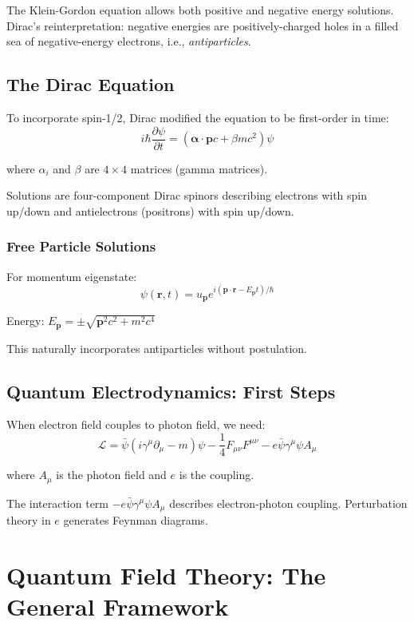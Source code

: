 \documentclass[12pt,openany,oneside]{book}
\begin{document}
{{{The Klein-Gordon equation allows both positive and negative energy solutions. Dirac's reinterpretation: negative energies are positively-charged holes in a filled sea of negative-energy electrons, i.e., \textit{antiparticles}.

\section{The Dirac Equation}

To incorporate spin-1/2, Dirac modified the equation to be first-order in time:
\[
i\hbar\frac{\partial\psi}{\partial t} = (\boldsymbol{\alpha} \cdot \mathbf{p}c + \beta mc^2)\psi
\]

where $\alpha_i$ and $\beta$ are $4 \times 4$ matrices (gamma matrices).

Solutions are four-component Dirac spinors describing electrons with spin up/down and antielectrons (positrons) with spin up/down.

\subsection{Free Particle Solutions}

For momentum eigenstate:
\[
\psi(\mathbf{r},t) = u_\mathbf{p}e^{i(\mathbf{p} \cdot \mathbf{r} - E_\mathbf{p}t)/\hbar}
\]

Energy: $E_\mathbf{p} = \pm\sqrt{\mathbf{p}^2c^2 + m^2c^4}$

This naturally incorporates antiparticles without postulation.

\section{Quantum Electrodynamics: First Steps}

When electron field couples to photon field, we need:
\[
\mathcal{L} = \bar{\psi}(i\gamma^\mu\partial_\mu - m)\psi - \frac{1}{4}F_{\mu\nu}F^{\mu\nu} - e\bar{\psi}\gamma^\mu\psi A_\mu
\]

where $A_\mu$ is the photon field and $e$ is the coupling.

The interaction term $-e\bar{\psi}\gamma^\mu\psi A_\mu$ describes electron-photon coupling. Perturbation theory in $e$ generates Feynman diagrams.

\chapter{Quantum Field Theory: The General Framework}

}}}
\end{document}
